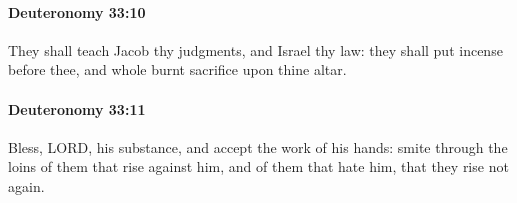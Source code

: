 		\paragraph{Deuteronomy 33:10} %
			\label{DEUTERONOMY-33-10}

			They shall teach Jacob thy judgments, and Israel thy law: they shall put incense before thee, and whole burnt sacrifice upon thine altar.


		\paragraph{Deuteronomy 33:11} %
			\label{DEUTERONOMY-33-11}

			Bless, LORD, his substance, and accept the work of his hands: smite through the loins of them that rise against him, and of them that hate him, that they rise not again.


